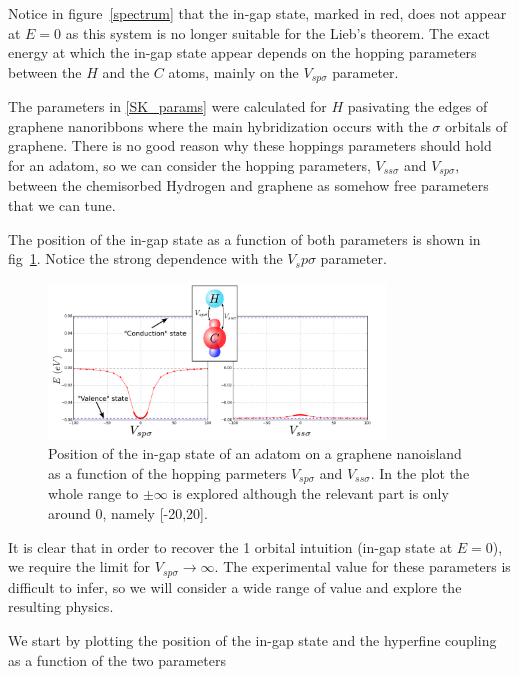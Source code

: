 Notice in figure~\ref{spectrum} that the in-gap state, marked in red, does not appear at $E=0$ as this system is no longer suitable for the Lieb's theorem. The exact energy at which the in-gap state appear depends on the hopping parameters between the $H$ and the $C$ atoms, mainly on the $V_{sp\sigma}$ parameter.

The parameters in \ref{SK_params} were calculated for $H$ pasivating the edges of graphene nanoribbons where the main hybridization occurs with the $\sigma$ orbitals of graphene. There is no good reason why these hoppings parameters should hold for an adatom, so we can consider the hopping parameters, $V_{ss\sigma}$ and $V_{sp\sigma}$, between the chemisorbed Hydrogen and graphene as somehow free parameters that we can tune.

The position of the in-gap state as a function of both parameters is shown in fig~\ref{ingap}. Notice the strong dependence with the $V_sp\sigma$ parameter.
\begin{figure}[h!]
  \centering
  \includegraphics[width=0.8\textwidth]{defects/fig/Vsss_Vsps.pdf}
  \vspace{-5pt}
\caption{Position of the in-gap state of an adatom on a graphene nanoisland as a function of the hopping parmeters $V_{sp\sigma}$ and $V_{ss\sigma}$. In the plot the whole range to $\pm\infty$ is explored although the relevant part is only around 0, namely [-20,20].}
\label{ingap}
\end{figure}
\FloatBarrier
It is clear that in order to recover the 1 orbital intuition (in-gap state at $E=0$), we require the limit for $V_{sp\sigma}\to\infty$. The experimental value for these parameters is difficult to infer, so we will consider a wide range of value and explore the resulting physics.

We start by plotting the position of the in-gap state and the hyperfine coupling  as a function of the two parameters


